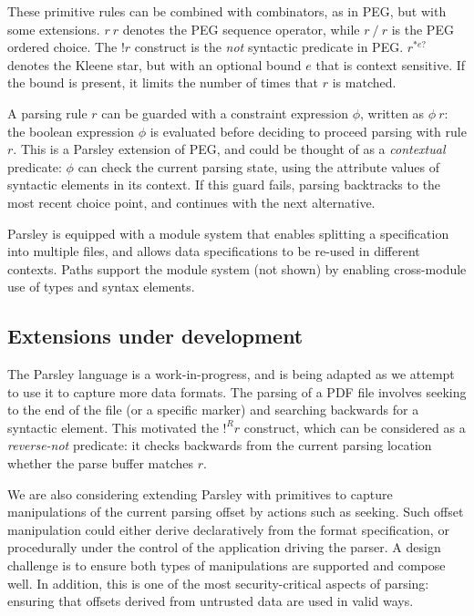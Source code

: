 \documentclass[letterpaper]{article}
\begin{document}
These primitive rules can be combined with combinators, as in PEG, but
with some extensions.  $r\ r$ denotes the PEG sequence operator, while
$r\ /\ r$ is the PEG ordered choice.  The $!r$ construct is the
\emph{not} syntactic predicate in PEG.  $r^{*e?}$ denotes the Kleene
star, but with an optional bound $e$ that is context sensitive.  If
the bound is present, it limits the number of times that $r$ is
matched.

A parsing rule $r$ can be guarded with a constraint expression $\phi$,
written as $\phi\ r$: the boolean expression $\phi$ is evaluated
before deciding to proceed parsing with rule $r$.  This is a Parsley
extension of PEG, and could be thought of as a \emph{contextual}
predicate: $\phi$ can check the current parsing state, using the
attribute values of syntactic elements in its context.  If this guard
fails, parsing backtracks to the most recent choice point, and
continues with the next alternative.

Parsley is equipped with a module system that enables splitting a
specification into multiple files, and allows data specifications to
be re-used in different contexts.  Paths support the module system
(not shown) by enabling cross-module use of types and syntax elements.

\subsection*{Extensions under development}

The Parsley language is a work-in-progress, and is being adapted as we
attempt to use it to capture more data formats.  The parsing of a PDF
file involves seeking to the end of the file (or a specific marker)
and searching backwards for a syntactic element.  This motivated the
$!^Rr$ construct, which can be considered as a \emph{reverse-not}
predicate: it checks backwards from the current parsing location
whether the parse buffer matches $r$.

We are also considering extending Parsley with primitives to capture
manipulations of the current parsing offset by actions such as
seeking.  Such offset manipulation could either derive declaratively
from the format specification, or procedurally under the control of
the application driving the parser.  A design challenge is to ensure
both types of manipulations are supported and compose well.  In
addition, this is one of the most security-critical aspects of
parsing: ensuring that offsets derived from untrusted data are used in
valid ways.
\end{document}
